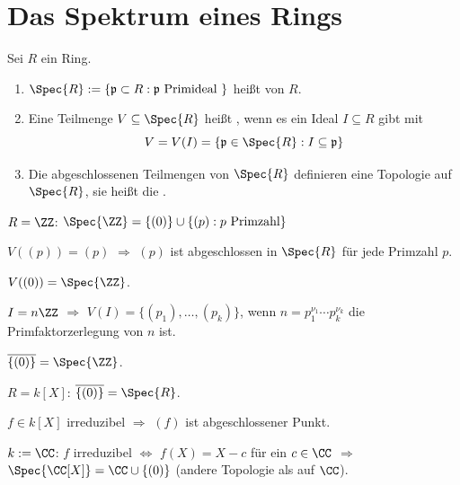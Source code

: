 \section{Das Spektrum eines Rings}

\begin{DefBem}
Sei $R$ ein Ring.

\begin{enumerate}
\item $\Spec{R} := \{ \mathfrak{p} \subset R : \mathfrak{p} \text{ Primideal } \}$ hei\ss t  von $R$.

\item Eine Teilmenge $V \subseteq \Spec{R}$ hei\ss t , wenn es ein Ideal $I \subseteq R$ gibt mit
$$V = V(I) = \{ \mathfrak{p} \in \Spec{R} : I \subseteq \mathfrak{p} \}$$

\item Die abgeschlossenen Teilmengen von $\Spec{R}$ definieren eine Topologie auf $\Spec{R}$, sie hei\ss t die .
\end{enumerate}
\end{DefBem}

\begin{nnBsp}
$R = \ZZ$: $\Spec{\ZZ} = \{ (0) \} \cup \{ (p) : p \text{ Primzahl} \}$

$V( (p) ) = (p)$ $\Rightarrow$ $(p)$ ist abgeschlossen in $\Spec{R}$ f\"ur jede Primzahl $p$.

$V( (0) ) = \Spec{\ZZ}$.

$I = n \ZZ$ $\Rightarrow$ $V(I) = \{ (p_1), \ldots, (p_k) \}$, wenn $n = p_1^{\nu_1} \cdots p_k^{\nu_k}$ die Primfaktorzerlegung von $n$ ist.

$\overline{ \{ (0) \} } = \Spec{\ZZ}$.
\bigskip

$R = k[X]$: $\overline{ \{ (0) \} } = \Spec{R}$.

$f \in k[X]$ irreduzibel $\Rightarrow$ $(f)$ ist abgeschlossener Punkt.

$k := \CC$: $f$ irreduzibel $\Leftrightarrow$ $f(X) = X - c$ f\"ur ein $c \in
\CC$ $\Rightarrow$ $\Spec{\CC[X]} = \CC \cup \{ (0) \}$ (andere Topologie als
auf $\CC$).

\end{nnBsp}

